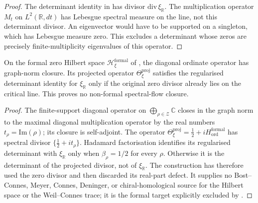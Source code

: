 \begin{proof}
The determinant identity in
 has divisor
\(\mathrm{div}\,\xi_{\mathbb R}\). The multiplication operator
\(M_{t}\) on \(L^{2}(\mathbb{R},dt)\) has Lebesgue spectral measure on
the line, not this determinant divisor. An eigenvector would have to be supported on a singleton, which
has Lebesgue measure zero. This excludes a determinant whose zeros
are precisely finite-multiplicity eigenvalues of this operator.
\end{proof}

\begin{proposition}
\label{v4-arith:w9-r4:prop:formal-zero-closure-tautological}
\ClaimStatusProvedHere On the formal zero Hilbert space
\(\mathcal{H}_{\xi}^{\mathrm{formal}}\) of
, the diagonal ordinate
operator has graph-norm closure. Its projected operator
\(\Theta_{\xi}^{\mathrm{proj}}\) satisfies the regularised
determinant identity for \(\xi_{\mathbb R}\) only if the original
zero divisor already lies on the critical line. This proves no
non-formal spectral-flow closure.
\end{proposition}

\begin{proof}
The finite-support diagonal operator on
\(\bigoplus_{\rho\in\mathcal Z}\mathbb{C}\) closes in the graph norm to
the maximal diagonal multiplication operator by the real numbers
\(t_{\rho}=\mathrm{Im}(\rho)\); its closure is self-adjoint. The
operator \(\Theta_{\xi}^{\mathrm{proj}}=\tfrac12+iH_{\mathrm{ord}}^{\mathrm{formal}}\)
has spectral divisor
\(\{\tfrac12+it_{\rho}\}\). Hadamard factorisation identifies its
regularised determinant with \(\xi_{\mathbb R}\) only when
\(\beta_{\rho}=1/2\) for every \(\rho\). Otherwise it is the
determinant of the projected divisor, not of \(\xi_{\mathbb R}\).
The construction has therefore used the zero divisor and then
discarded its real-part defect. It supplies no Bost--Connes, Meyer,
Connes, Deninger, or chiral-homological source for the Hilbert space
or the Weil--Connes trace; it is the formal target explicitly excluded
by .
\end{proof}


